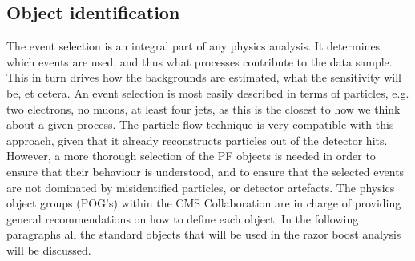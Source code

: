
\subsection{Object identification}

The event selection is an integral part of any physics analysis. It determines which events are
used, and thus what processes contribute to the data sample. This in turn drives how the
backgrounds are estimated, what the sensitivity will be, et cetera. 
An event selection is most easily described in terms of particles, e.g. two electrons, no muons, at
least four jets, as this is the closest to how we think about a given process.  
The particle flow technique is very compatible with this approach, given that it already
reconstructs particles out of the detector hits. 
However, a more thorough selection of the PF objects is needed in order to ensure that their
behaviour is understood, and to ensure that the selected events are not dominated by
misidentified particles, or detector artefacts. 
The physics object groups (POG's) within the CMS Collaboration are in charge of providing general
recommendations on how to define each object. 
In the following paragraphs all the standard objects that will be used in the razor boost analysis
will be discussed.


